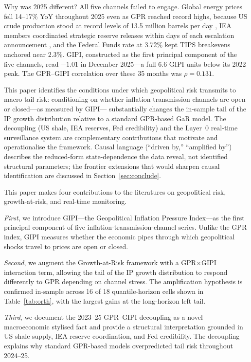 \documentclass[12pt]{article}
\begin{document}
Why was 2025 different?
All five channels failed to engage.
Global energy prices fell 14--17\% YoY throughout 2025 even as
GPR reached record highs, because US crude production stood at
record levels of 13.5 million barrels per day \citep{eia2025},
IEA members coordinated strategic reserve releases within days of
each escalation announcement \citep{aiyar2023}, and
the Federal Funds rate at 3.72\% kept TIPS breakevens anchored
near 2.3\%.
GIPI, constructed as the first principal component of the five
channels, read $-1.01$ in December 2025---a full 6.6 GIPI units
below its 2022 peak.
The GPR--GIPI correlation over these 35 months was $\rho = 0.131$.

This paper identifies the conditions under which geopolitical risk
transmits to macro tail risk: conditioning on whether inflation
transmission channels are open or closed---as measured by GIPI---
substantially changes the in-sample tail of the IP growth distribution
relative to a standard GPR-based GaR model.
The decoupling (US shale, IEA reserves, Fed credibility) and the
Layer~0 real-time surveillance system are complementary contributions
that motivate and operationalise the framework.
Causal language (``driven by,'' ``amplified by'') describes the
reduced-form state-dependence the data reveal, not identified structural
parameters; the frontier extensions that would sharpen causal
identification are discussed in Section~\ref{sec:conclude}.

\medskip
This paper makes four contributions to the literatures on geopolitical risk,
growth-at-risk, and real-time monitoring.

\textit{First}, we introduce GIPI---the Geopolitical Inflation Pressure Index---as
the first principal component of five inflation-transmission-channel series.
Unlike the GPR index, GIPI measures whether the economic pipes through which
geopolitical shocks travel to prices are open or closed.

\textit{Second}, we augment the Growth-at-Risk framework with a GPR$\times$GIPI
interaction term, allowing the tail of the IP growth distribution to respond
differently to GPR depending on channel stress.
The amplification hypothesis is confirmed in-sample across 16 of 18
quantile-horizon cells shown in Table~\ref{tab:orth}, with the largest
gains at the long-horizon left tail.

\textit{Third}, we document the 2023--25 GPR--GIPI decoupling as a novel
macroeconomic stylised fact and provide a structural interpretation grounded
in US shale supply, IEA reserve coordination, and Fed credibility.
The decoupling explains why standard GPR-based models overpredicted tail risk
throughout 2024--25.
\end{document}
